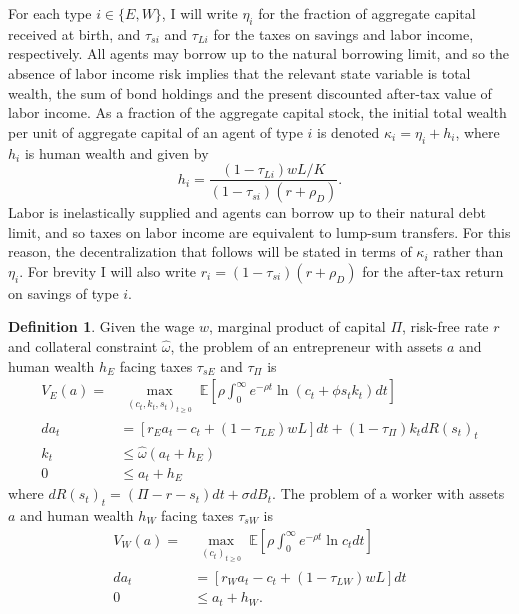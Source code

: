 \documentclass[11pt]{article}
\theoremstyle{plain}
\theoremstyle{definition} %
\newtheorem{defn}{Definition}[section]
\begin{document}
For each type $i \in \{E,W\}$, I will write $\eta_i$ for the fraction of aggregate capital received at birth, and $\tau_{si}$ and $\tau_{Li}$ for the taxes on savings and labor income, respectively. All agents may borrow up to the natural borrowing limit, and so the absence of labor income risk implies that the relevant state variable is total wealth, the sum of bond holdings and the present discounted after-tax value of labor income. As a fraction of the aggregate capital stock, the initial total wealth per unit of aggregate capital of an agent of type $i$ is denoted $\kappa_i = \eta_i + h_i$, where $h_i$ is human wealth and given by
$$
h_i = \frac{(1-\tau_{Li})wL/K}{(1-\tau_{si})(r + \rho_D)}.
$$
Labor is inelastically supplied and agents can borrow up to their natural debt limit, and so taxes on labor income are equivalent to lump-sum transfers. For this reason, the decentralization that follows will be stated in terms of $\kappa_i$ rather than $\eta_i$. For brevity I will also write $r_i = (1-\tau_{si})(r+\rho_D)$ for the after-tax return on savings of type $i$. 

\begin{defn}\label{defnPROB}
Given the wage $w$, marginal product of capital $\Pi$, risk-free rate $r$ and collateral constraint $\hat{\omega}$, the problem of an entrepreneur with assets $a$ and human wealth $h_E$ facing taxes $\tau_{sE}$ and $\tau_{\Pi}$ is
\begin{align*}
V_E(a) = & \max_{\substack{(c_t,k_t,s_t)_{t\geq0}}}  \mathbb{E}{\left[\rho\int_{0}^{\infty}e^{-\rho t} \ln (c_t + \phi s_tk_t)dt\right]}
\\ da_t & = {\left[r_Ea_t - c_t + (1-\tau_{LE})wL\right]}dt + (1-\tau_{\Pi})k_tdR(s_t)_t
\\ k_t & \leq \hat{\omega} (a_t + h_E)
\\ 0 & \leq a_t + h_E 
\end{align*}
where $dR(s_t)_t = (\Pi - r - s_t)dt + \sigma dB_t$. The problem of a worker with assets $a$ and human wealth $h_W$ facing taxes $\tau_{sW}$ is
\begin{align*}
V_W(a) = & \max_{\substack{(c_t)_{t\geq0}}} \mathbb{E}{\left[\rho\int_{0}^{\infty}e^{-\rho t} \ln c_t dt\right]}
\\ da_t & = {\left[r_Wa_t - c_t + (1-\tau_{LW})wL\right]}dt
\\ 0 & \leq a_t + h_W. 
\end{align*}
\end{defn}
\end{document}
